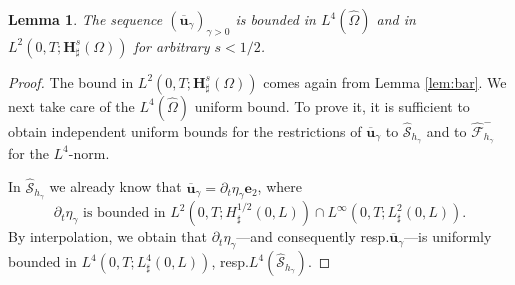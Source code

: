 \documentclass[11pt]{article}
\newcommand{\resp}{resp.\xspace}
\let\mathcal\mathscr
\newtheorem{lemma}[theorem]{Lemma}
\theoremstyle{remark}
\theoremstyle{definition}
\newcommand{\ug}{\boldsymbol{u}}
\newcommand{\BS}[1]{\boldsymbol{#1}}
\let\CM\Omega
\newcommand{\CMT}{\widehat{\Omega}}
\begin{document}
\begin{lemma}
\label{lem:extension-u}
The sequence $(\overline{\ug}_{\gamma})_{\gamma >0}$ is bounded in $L^{4}(\CMT)$ and in
$L^{2}(0,T;\BS{H}^{s}_{\sharp}(\CM))$ for arbitrary $s<1/2$.
\end{lemma}
\begin{proof}The bound in $L^{2}(0,T;\BS{H}^{s}_{\sharp}(\CM))$ comes again from Lemma \ref{lem:bar}. We next take care of the $L^{4}(\CMT)$ uniform bound.
To prove it, it is sufficient to obtain independent uniform bounds for the restrictions
of $\overline{\ug}_{\gamma}$ to $\widehat{\mathcal S}_{h_{\gamma}}$ and to $\widehat{\mathcal F}^{-}_{h_{\gamma}}$ for the $L^4$-norm.

In $\widehat{\mathcal{S}}_{h_{\gamma}}$ we already know that $\overline{\ug}_{\gamma}=\partial_{t}\eta_{\gamma}\BS{e}_{2}$, where 
\[
\text{$\partial_t{\eta}_{\gamma}$ is bounded in $L^{2}(0,T;H_\sharp^{1/2}(0,L)) \cap L^{\infty}(0,T;L_\sharp^{2}(0,L))$.}
\]
By interpolation, we obtain that $\partial_{t}\eta_{\gamma}$---and consequently \resp $\overline{\ug}_{\gamma}$---is uniformly bounded in $L^{4}(0,T;L_\sharp^{4}(0,L))$, \resp $L^4(\widehat{\mathcal S}_{h_{\gamma}})$.


\end{proof}
\end{document}
